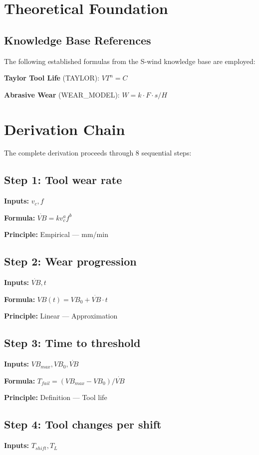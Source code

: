 \documentclass[11pt,twocolumn]{article}
\begin{document}
\section{Theoretical Foundation}

\subsection{Knowledge Base References}
The following established formulas from the S-wind knowledge base are employed:

\textbf{Taylor Tool Life} (TAYLOR): $VT^n = C$ \cite{Taylor}

\textbf{Abrasive Wear} (WEAR_MODEL): $W = k \cdot F \cdot s / H$ \cite{Archard}


\section{Derivation Chain}

The complete derivation proceeds through 8 sequential steps:

\subsection*{Step 1: Tool wear rate}
\textbf{Inputs:} $v_c, f$

\textbf{Formula:} $\dot{VB} = k v_c^a f^b$

\textbf{Principle:} Empirical --- mm/min

\subsection*{Step 2: Wear progression}
\textbf{Inputs:} $\dot{VB}, t$

\textbf{Formula:} $VB(t) = VB_0 + \dot{VB} \cdot t$

\textbf{Principle:} Linear --- Approximation

\subsection*{Step 3: Time to threshold}
\textbf{Inputs:} $VB_{max}, VB_0, \dot{VB}$

\textbf{Formula:} $T_{fail} = (VB_{max}-VB_0)/\dot{VB}$

\textbf{Principle:} Definition --- Tool life

\subsection*{Step 4: Tool changes per shift}
\textbf{Inputs:} $T_{shift}, T_L$
\end{document}
